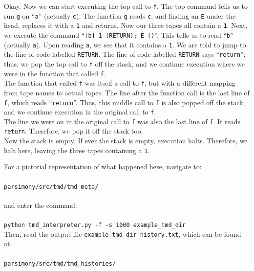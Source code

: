 \documentclass[11pt]{article}
\begin{document}
Okay. Now we can start executing the top call to \texttt{f}. The top command tells us to run \texttt{g} on ``\texttt{a}'' (actually \texttt{c}). The function \texttt{g} reads \texttt{c}, and finding an \texttt{E} under the head, replaces it with a \texttt{1} and returns. Now our three tapes all contain a \texttt{1}. Next, we execute the command ``\texttt{[b] 1 (RETURN); E ()}''. This tells us to read ``\texttt{b}'' (actually \texttt{a}). Upon reading \texttt{a}, we see that it contains a \texttt{1}. We are told to jump to the line of code labelled \texttt{RETURN}. The line of code labelled \texttt{RETURN} says ``\texttt{return}''; thus, we pop the top call to \texttt{f} off the stack, and we continue execution where we were in the function that called \texttt{f}. \\

The function that called \texttt{f} was itself a call to \texttt{f}, but with a different mapping from tape names to actual tapes. The line after the function call is the last line of \texttt{f}, which reads ``\texttt{return}''. Thus, this middle call to \texttt{f} is also popped off the stack, and we continue execution in the original call to \texttt{f}. \\

The line we were on in the original call to \texttt{f} was also the last line of \texttt{f}. It reads \texttt{return}. Therefore, we pop it off the stack too. \\

Now the stack is empty. If ever the stack is empty, execution halts. Therefore, we halt here, leaving the three tapes containing a \texttt{1}.

For a pictorial representation of what happened here, navigate to: \\ \\
\texttt{parsimony/src/tmd/tmd\_meta/} \\ \\
and enter the command: \\ \\
\texttt{python tmd\_interpreter.py -f -s 1000 example\_tmd\_dir} \\

Then, read the output file \texttt{example\_tmd\_dir\_history.txt}, which can be found at: \\ \\  \texttt{parsimony/src/tmd/tmd\_histories/}
\end{document}
